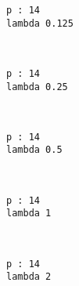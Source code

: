 \documentclass[11pt]{article}
\begin{document}
    \begin{Verbatim}[commandchars=\\\{\}]
p : 14
lambda 0.125

    \end{Verbatim}

    \begin{center}
    \end{center}
    { \hspace*{\fill} \\}
    
    \begin{Verbatim}[commandchars=\\\{\}]
p : 14
lambda 0.25

    \end{Verbatim}

    \begin{center}
    \end{center}
    { \hspace*{\fill} \\}
    
    \begin{Verbatim}[commandchars=\\\{\}]
p : 14
lambda 0.5

    \end{Verbatim}

    \begin{center}
    \end{center}
    { \hspace*{\fill} \\}
    
    \begin{Verbatim}[commandchars=\\\{\}]
p : 14
lambda 1

    \end{Verbatim}

    \begin{center}
    \end{center}
    { \hspace*{\fill} \\}
    
    \begin{Verbatim}[commandchars=\\\{\}]
p : 14
lambda 2

    \end{Verbatim}
\end{document}
